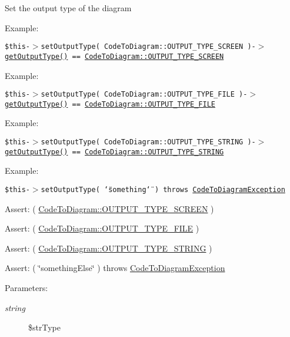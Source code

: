 Set the output type of the diagram

\begin{Desc}
\item[Example:]\end{Desc}
{\tt  \$this-$>$setOutputType( CodeToDiagram::OUTPUT\_\-TYPE\_\-SCREEN )-$>$\hyperlink{class_code_to_diagram_04fb2bc09c8adb24bf9c585bb4dee691}{getOutputType()} == \hyperlink{class_code_to_diagram_746cadd14bdda9d3c0ae3c4433bc2478}{CodeToDiagram::OUTPUT\_\-TYPE\_\-SCREEN} } \begin{Desc}
\item[Example:]\end{Desc}
{\tt  \$this-$>$setOutputType( CodeToDiagram::OUTPUT\_\-TYPE\_\-FILE )-$>$\hyperlink{class_code_to_diagram_04fb2bc09c8adb24bf9c585bb4dee691}{getOutputType()} == \hyperlink{class_code_to_diagram_6432f4d95031e2666449bb92c20f7d7e}{CodeToDiagram::OUTPUT\_\-TYPE\_\-FILE} } \begin{Desc}
\item[Example:]\end{Desc}
{\tt  \$this-$>$setOutputType( CodeToDiagram::OUTPUT\_\-TYPE\_\-STRING )-$>$\hyperlink{class_code_to_diagram_04fb2bc09c8adb24bf9c585bb4dee691}{getOutputType()} == \hyperlink{class_code_to_diagram_7b2a676828728d3c85df18eebb42854f}{CodeToDiagram::OUTPUT\_\-TYPE\_\-STRING} } \begin{Desc}
\item[Example:]\end{Desc}
{\tt  \$this-$>$setOutputType( \char`\"{}something\char`\"{} ) throws \hyperlink{class_code_to_diagram_exception}{CodeToDiagramException} } \begin{Desc}
\item[Assert:]( \hyperlink{class_code_to_diagram_746cadd14bdda9d3c0ae3c4433bc2478}{CodeToDiagram::OUTPUT\_\-TYPE\_\-SCREEN} ) \end{Desc}
\begin{Desc}
\item[Assert:]( \hyperlink{class_code_to_diagram_6432f4d95031e2666449bb92c20f7d7e}{CodeToDiagram::OUTPUT\_\-TYPE\_\-FILE} ) \end{Desc}
\begin{Desc}
\item[Assert:]( \hyperlink{class_code_to_diagram_7b2a676828728d3c85df18eebb42854f}{CodeToDiagram::OUTPUT\_\-TYPE\_\-STRING} ) \end{Desc}
\begin{Desc}
\item[Assert:]( \char`\"{}somethingElse\char`\"{} ) throws \hyperlink{class_code_to_diagram_exception}{CodeToDiagramException} \end{Desc}
\begin{Desc}
\item[Parameters:]
\begin{description}
\item[{\em string}]\$strType \end{description}
\end{Desc}


